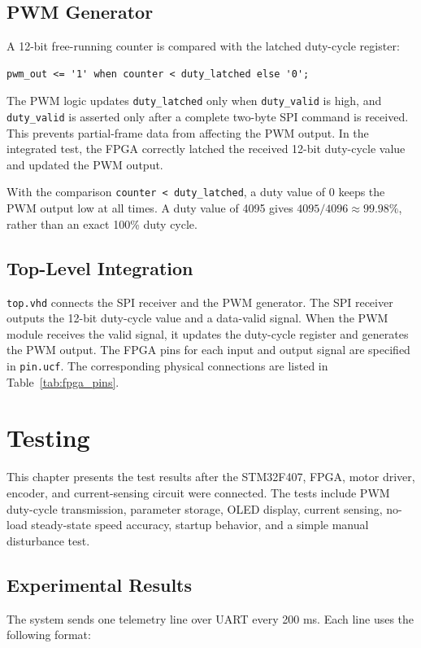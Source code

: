 \documentclass[12pt, a4paper]{report}
\begin{document}
\section{PWM Generator}

A 12-bit free-running counter is compared with the latched duty-cycle register:
\begin{lstlisting}[style=vhdlstyle,caption={PWM comparator}]
pwm_out <= '1' when counter < duty_latched else '0';
\end{lstlisting}
The PWM logic updates \texttt{duty\_latched} only when \texttt{duty\_valid} is high, and \texttt{duty\_valid} is asserted only after a complete two-byte SPI command is received. This prevents partial-frame data from affecting the PWM output. In the integrated test, the FPGA correctly latched the received 12-bit duty-cycle value and updated the PWM output.

With the comparison \texttt{counter < duty\_latched}, a duty value of 0 keeps the PWM output low at all times. A duty value of 4095 gives \(4095/4096 \approx 99.98\%\), rather than an exact 100\% duty cycle.


\section{Top-Level Integration}

\texttt{top.vhd} connects the SPI receiver and the PWM generator. The SPI receiver outputs the 12-bit duty-cycle value and a data-valid signal. When the PWM module receives the valid signal, it updates the duty-cycle register and generates the PWM output. The FPGA pins for each input and output signal are specified in \texttt{pin.ucf}. The corresponding physical connections are listed in Table~\ref{tab:fpga_pins}.
\chapter{Testing}

This chapter presents the test results after the STM32F407, FPGA, motor driver, encoder, and current-sensing circuit were connected. The tests include PWM duty-cycle transmission, parameter storage, OLED display, current sensing, no-load steady-state speed accuracy, startup behavior, and a simple manual disturbance test.


\section{Experimental Results}
The system sends one telemetry line over UART every 200 ms. Each line uses the following format:
\end{document}

